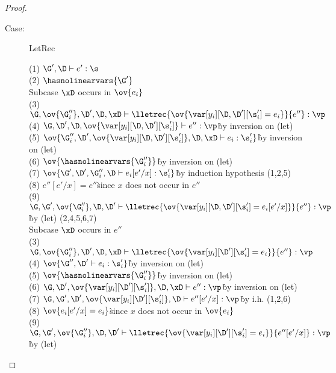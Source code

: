 \begin{proof}
\begin{description}
\item[Case:] LetRec
\begin{tabbing}
    (1) $\G',\D \vdash e' : \s$\\
    (2) $\hasnolinearvars{\G'}$\\
    Subcase $\xD$ occurs in $\ov{e_i}$\\
    (3) $\G, \ov{\G''_i}, \D', \D, \xD \vdash \lletrec{\ov{\var[y_i][\D,\D'][\s_i'] = e_i}}{e''} : \vp$\\
    (4) $\G,\D',\D,\ov{\var[y_i][\D,\D'][\s'_i]} \vdash e'' : \vp$\` by inversion on (let)\\
    (5) $\ov{\G''_i,\D', \ov{\var[y_i][\D,\D'][\s'_i]}, \D, \xD \vdash e_i : \s'_i}$\` by inversion on (let)\\
    (6) $\ov{\hasnolinearvars{\G''_i}}$\` by inversion on (let)\\
    (7) $\ov{\G',\D',\G''_i,\D \vdash e_i[e'/x] : \s'_i}$\` by induction hypothesis (1,2,5)\\
    (8) $e''[e'/x] = e''$\` since $x$ does not occur in $e''$\\
    (9) $\G,\G',\ov{\G''_i},\D,\D' \vdash \lletrec{\ov{\var[y_i][\D,\D'][\s_i'] = e_i[e'/x]}}{e''} : \vp$\` by (let) (2,4,5,6,7)\\
    Subcase $\xD$ occurs in $e''$\\
    (3) $\G, \ov{\G''_i}, \D', \D, \xD \vdash \lletrec{\ov{\var[y_i][\D'][\s_i'] = e_i}}{e''} : \vp$\\
    (4) $\ov{\G'',\D' \vdash e_i : \s'_i}$\` by inversion on (let)\\
    (5) $\ov{\hasnolinearvars{\G''_i}}$\` by inversion on (let)\\
    (6) $\G,\D',\ov{\var[y_i][\D'][\s'_i]},\D,\xD \vdash e'' : \vp$\` by inversion on (let)\\
    (7) $\G,\G',\D',\ov{\var[y_i][\D'][\s'_i]},\D \vdash e''[e'/x] : \vp$\` by i.h. (1,2,6)\\
    (8) $\ov{e_i[e'/x] = e_i}$\` since $x$ does not occur in $\ov{e_i}$\\
    (9) $\G,\G',\ov{\G''_i},\D,\D' \vdash \lletrec{\ov{\var[y_i][\D'][\s'_i] = e_i}}{e''[e'/x]} : \vp$\` by (let)\\
\end{tabbing}


\end{description}
\end{proof}

